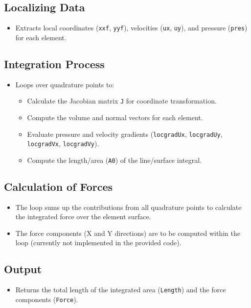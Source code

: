 \documentclass[a4paper,12pt]{article} %
\begin{document}
\subsection*{Localizing Data}
\begin{itemize}
    \item Extracts local coordinates (\texttt{xxf}, \texttt{yyf}), velocities (\texttt{ux}, \texttt{uy}), and pressure (\texttt{pres}) for each element.
\end{itemize}

\subsection*{Integration Process}
\begin{itemize}
    \item Loops over quadrature points to:
    \begin{itemize}
        \item Calculate the Jacobian matrix \texttt{J} for coordinate transformation.
        \item Compute the volume and normal vectors for each element.
        \item Evaluate pressure and velocity gradients (\texttt{locgradUx}, \texttt{locgradUy}, \texttt{locgradVx}, \texttt{locgradVy}).
        \item Compute the length/area (\texttt{A0}) of the line/surface integral.
    \end{itemize}
\end{itemize}

\subsection*{Calculation of Forces}
\begin{itemize}
    \item The loop sums up the contributions from all quadrature points to calculate the integrated force over the element surface.
    \item The force components (X and Y directions) are to be computed within the loop (currently not implemented in the provided code).
\end{itemize}

\subsection*{Output}
\begin{itemize}
    \item Returns the total length of the integrated area (\texttt{Length}) and the force components (\texttt{Force}).
\end{itemize}
\end{document}
